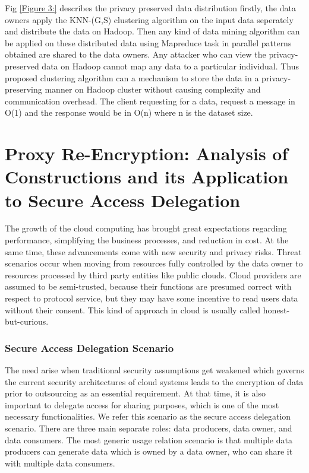 \documentclass[10pt,a4paper,journal]{IEEEtran}
\begin{document}
\hspace{2em}Fig \ref{Figure 3:} describes the privacy preserved data distribution firstly, the data owners apply the KNN-(G,S) clustering algorithm on the input data seperately and distribute the data on Hadoop. Then any  kind of data mining algorithm can be applied on these distributed data using Mapreduce task in parallel patterns obtained are shared to the data owners. Any attacker who can view the privacy-preserved data on Hadoop cannot map any data to a particular individual. Thus proposed clustering algorithm can a mechanism to store the data in a privacy-preserving manner on  Hadoop cluster without causing complexity and communication overhead. The client requesting for a data, request a message in O(1) and the response would be  in O(n) where n is the dataset size.
\section{Proxy Re-Encryption: Analysis of Constructions and its Application to Secure Access Delegation}
\hspace{2em}The growth of the cloud computing has brought great expectations regarding performance, simplifying the business processes, and reduction in cost. At the same time, these advancements come with new security and privacy risks\cite{9}. Threat scenarios occur when moving from resources fully controlled by the data owner to resources processed by third party entities like public clouds. Cloud providers are assumed to be semi-trusted, because their functions are presumed correct with respect to protocol service, but they may have some incentive to read users data without their consent. This kind of approach in cloud is usually called honest-but-curious.
\subsubsection{Secure Access Delegation Scenario}
The need arise when traditional security assumptions get weakened which governs the current security architectures of cloud systems leads to the encryption of data prior to outsourcing as an essential requirement. At that time, it is also important to delegate access for sharing purposes, which is one of the most necessary functionalities. We refer this scenario as the secure access delegation scenario. There are three main separate roles: data producers, data owner, and data consumers. The most generic usage relation scenario is that multiple data producers can generate data which is owned by a data owner, who can share it with multiple data consumers.
\end{document}
